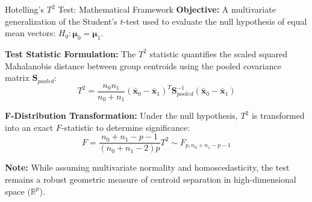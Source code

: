 \documentclass[8pt, aspectratio=169]{beamer}
\begin{document}
\begin{frame}{Hotelling’s $T^2$ Test: Mathematical Framework}
    \textbf{Objective:} A multivariate generalization of the Student's $t$-test used to evaluate the null hypothesis of equal mean vectors: $H_0: \boldsymbol{\mu}_0 = \boldsymbol{\mu}_1$.
    
    \vspace{0.2cm}
    \textbf{Test Statistic Formulation:}
    The $T^2$ statistic quantifies the scaled squared Mahalanobis distance between group centroids using the pooled covariance matrix $\mathbf{S}_{pooled}$:
    \begin{equation}
        T^2 = \frac{n_0 n_1}{n_0 + n_1}(\mathbf{\bar{x}}_0 - \mathbf{\bar{x}}_1)^T \mathbf{S}_{pooled}^{-1}(\mathbf{\bar{x}}_0 - \mathbf{\bar{x}}_1)
    \end{equation}
    
    \vspace{0.2cm}
    \textbf{F-Distribution Transformation:}
    Under the null hypothesis, $T^2$ is transformed into an exact $F$-statistic to determine significance:
    \begin{equation}
        F = \frac{n_0 + n_1 - p - 1}{(n_0 + n_1 - 2)p} T^2 \sim F_{p, n_0 + n_1 - p - 1}
    \end{equation}
    
    \small{\textbf{Note:} While assuming multivariate normality and homoscedasticity, the test remains a robust geometric measure of centroid separation in high-dimensional space ($\mathbb{R}^p$).}
\end{frame}
\end{document}

